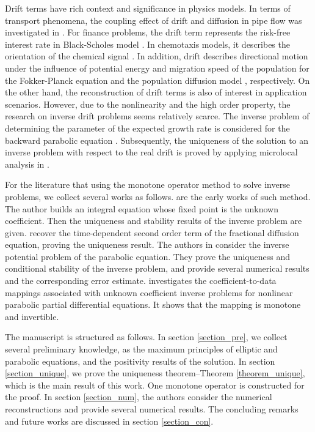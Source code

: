 \documentclass[11pt]{article}
\numberwithin{equation}{section}
\begin{document}
Drift terms have rich context and significance in physics models.
In terms of transport phenomena, the coupling effect of drift and diffusion in pipe flow was investigated in \cite{Taylor:1953}. For finance problems, the drift term represents the risk-free interest rate in Black-Scholes model \cite{BS:1973}. In chemotaxis models, it describes the orientation of the chemical signal \cite{KS:1971}. In addition, drift describes directional motion under the influence of potential energy and migration speed of the population for the Fokker-Planck equation \cite{Risken:1989} and the population diffusion model \cite{GurtinMacCamy:1977}, respectively.
On the other hand, the reconstruction of drift terms is also of interest in application scenarios. However, due to the nonlinearity and the high order property, the research on inverse drift problems seems relatively scarce. 
 The inverse problem of determining the parameter of the expected growth rate is considered for the backward parabolic equation \cite{KorolevKuboYagola:2012}. Subsequently, the uniqueness of the solution to an inverse problem with respect to the real drift is proved by applying microlocal analysis in \cite{DoiOta:2018}.
 
For the literature that using the monotone operator method to solve inverse problems, we collect several works as follows.  \cite{Jones:1962, Jones:1963} are the early works of such method. The author builds an integral equation whose fixed point is the unknown coefficient. Then the uniqueness and stability results of the inverse problem are given. \cite{Zhang:2016,Zhang:2017} recover the time-dependent second order term of the fractional diffusion equation, proving the uniqueness result. The authors in \cite{ZhangZhangZhou:2022} consider the inverse potential problem of the parabolic equation. They prove the uniqueness and conditional stability of the inverse problem, and provide several numerical results and the corresponding error estimate. \cite{Duchateau:1995} investigates the coefficient-to-data mappings associated with unknown coefficient inverse problems for nonlinear parabolic partial differential equations. It shows that the mapping is monotone and invertible.


The manuscript is structured as follows. In section \ref{section_pre}, we collect several preliminary knowledge, as the maximum principles of elliptic and parabolic equations, and the positivity results of the solution. In section \ref{section_unique}, we prove the uniqueness theorem--Theorem \ref{theorem_unique}, which is the main result of this work. One monotone operator is constructed for the proof. In section \ref{section_num}, the authors consider the numerical reconstructions and provide several numerical results. The concluding remarks and future works are discussed in section \ref{section_con}.
\end{document}
